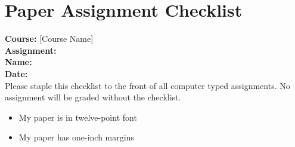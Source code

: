 \documentclass[11pt]{article}
\begin{document}
\thispagestyle{empty}

\section*{Paper Assignment Checklist}

\noindent
{\bf Course:} [Course Name] \bigskip 					\\
{\bf Assignment:} \shortstack{\underline{\hspace{6cm}}} \bigskip\bigskip\bigskip 	\\
{\bf Name:} \shortstack{\underline{\hspace{6cm}}} \bigskip 	\\
{\bf Date:} \shortstack{\underline{\hspace{6cm}}}			\\

\noindent
Please staple this checklist to the front of all computer typed assignments. No assignment will be graded without the checklist.

\vspace{1.0cm}

\hline\hline

\vspace{1.0cm}

\begin{minipage}{0.135\textwidth}
\end{minipage}
\begin{minipage}{0.8\textwidth}
\hline\vspace{0.25cm}
\begin{itemize}\itemsep-0.25em
	\item My paper is in twelve-point font
\end{itemize}	
\hline\vspace{0.25cm} 
\end{minipage}

\vspace{0.5cm}

\begin{minipage}{0.135\textwidth}
\end{minipage}
\begin{minipage}{0.8\textwidth}
\hline\vspace{0.25cm}
\begin{itemize}\itemsep-0.25em
	\item My paper has one-inch margins
\end{itemize}	
\hline\vspace{0.25cm} 
\end{minipage}
\end{document}
